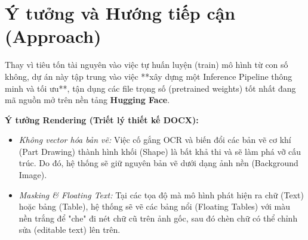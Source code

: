 \documentclass[12pt,a4paper]{article}
\begin{document}
\section{Ý tưởng và Hướng tiếp cận (Approach)}
Thay vì tiêu tốn tài nguyên vào việc tự huấn luyện (train) mô hình từ con số không, dự án này tập trung vào việc **xây dựng một Inference Pipeline thông minh và tối ưu**, tận dụng các file trọng số (pretrained weights) tốt nhất đang mã nguồn mở trên nền tảng \textbf{Hugging Face}.

\textbf{Ý tưởng Rendering (Triết lý thiết kế DOCX):}
\begin{itemize}
    \item \textit{Không vector hóa bản vẽ:} Việc cố gắng OCR và biến đổi các bản vẽ cơ khí (Part Drawing) thành hình khối (Shape) là bất khả thi và sẽ làm phá vỡ cấu trúc. Do đó, hệ thống sẽ giữ nguyên bản vẽ dưới dạng ảnh nền (Background Image).
    \item \textit{Masking \& Floating Text:} Tại các tọa độ mà mô hình phát hiện ra chữ (Text) hoặc bảng (Table), hệ thống sẽ vẽ các bảng nổi (Floating Tables) với màu nền trắng để "che" đi nét chữ cũ trên ảnh gốc, sau đó chèn chữ có thể chỉnh sửa (editable text) lên trên.
\end{itemize}
\end{document}
